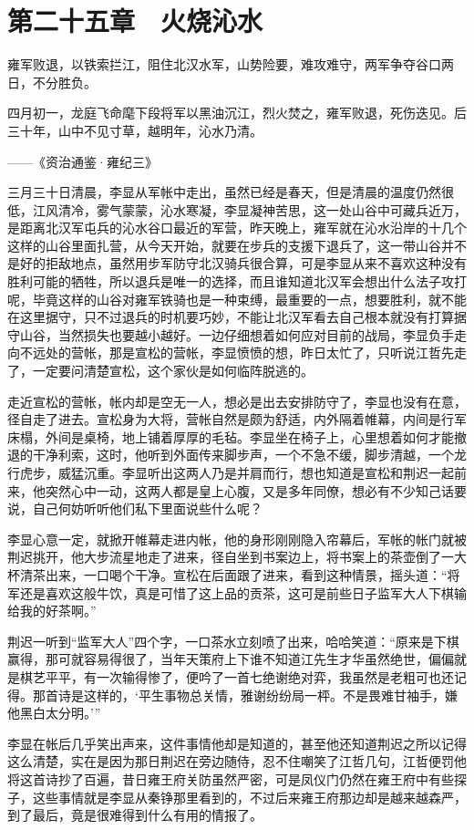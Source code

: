 \chapter{第二十五章　火烧沁水}

雍军败退，以铁索拦江，阻住北汉水军，山势险要，难攻难守，两军争夺谷口两日，不分胜负。

四月初一，龙庭飞命麾下段将军以黑油沉江，烈火焚之，雍军败退，死伤迭见。后三十年，山中不见寸草，越明年，沁水乃清。

——《资治通鉴·雍纪三》

三月三十日清晨，李显从军帐中走出，虽然已经是春天，但是清晨的温度仍然很低，江风清冷，雾气蒙蒙，沁水寒凝，李显凝神苦思，这一处山谷中可藏兵近万，是距离北汉军屯兵的沁水谷口最近的军营，昨天晚上，雍军就在沁水沿岸的十几个这样的山谷里面扎营，从今天开始，就要在步兵的支援下退兵了，这一带山谷并不是好的拒敌地点，虽然用步军防守北汉骑兵很合算，可是李显从来不喜欢这种没有胜利可能的牺牲，所以退兵是唯一的选择，而且谁知道北汉军会想出什么法子攻打呢，毕竟这样的山谷对雍军铁骑也是一种束缚，最重要的一点，想要胜利，就不能在这里据守，只不过退兵的时机要巧妙，不能让北汉军看去自己根本就没有打算据守山谷，当然损失也要越小越好。一边仔细想着如何应对目前的战局，李显负手走向不远处的营帐，那是宣松的营帐，李显愤愤的想，昨日太忙了，只听说江哲先走了，一定要问清楚宣松，这个家伙是如何临阵脱逃的。

走近宣松的营帐，帐内却是空无一人，想必是出去安排防守了，李显也没有在意，径自走了进去。宣松身为大将，营帐自然是颇为舒适，内外隔着帷幕，内间是行军床榻，外间是桌椅，地上铺着厚厚的毛毡。李显坐在椅子上，心里想着如何才能撤退的干净利索，这时，他听到外面传来脚步声，一个不急不缓，脚步清越，一个龙行虎步，威猛沉重。李显听出这两人乃是并肩而行，想也知道是宣松和荆迟一起前来，他突然心中一动，这两人都是皇上心腹，又是多年同僚，想必有不少知己话要说，自己何妨听听他们私下里面说些什么呢？

李显心意一定，就掀开帷幕走进内帐，他的身形刚刚隐入帘幕后，军帐的帐门就被荆迟挑开，他大步流星地走了进来，径自坐到书案边上，将书案上的茶壶倒了一大杯清茶出来，一口喝个干净。宣松在后面跟了进来，看到这种情景，摇头道：“将军还是喜欢这般牛饮，真是可惜了这上品的贡茶，这可是前些日子监军大人下棋输给我的好茶啊。”

荆迟一听到“监军大人”四个字，一口茶水立刻喷了出来，哈哈笑道：“原来是下棋赢得，那可就容易得很了，当年天策府上下谁不知道江先生才华虽然绝世，偏偏就是棋艺平平，有一次输得惨了，便吟了一首七绝谢绝对弈，我虽然是老粗可也还记得。那首诗是这样的，‘平生事物总关情，雅谢纷纷局一枰。不是畏难甘袖手，嫌他黑白太分明。’”

李显在帐后几乎笑出声来，这件事情他却是知道的，甚至他还知道荆迟之所以记得这么清楚，实在是因为那日荆迟在旁边随侍，忍不住嘲笑了江哲几句，江哲便罚他将这首诗抄了百遍，昔日雍王府关防虽然严密，可是凤仪门仍然在雍王府中有些探子，这些事情就是李显从秦铮那里看到的，不过后来雍王府那边却是越来越森严，到了最后，竟是很难得到什么有用的情报了。

